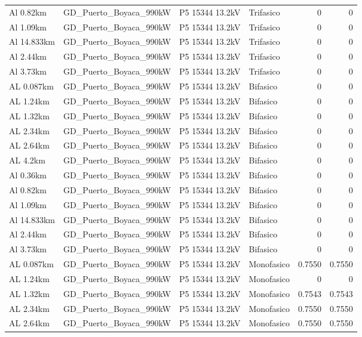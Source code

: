 \documentclass[11pt,a4paper]{article}
\begin{document}
\begin{longtable}{llllrr}
Al 0.82km & GD\_Puerto\_Boyaca\_990kW & P5 15344 13.2kV & Trifasico & 0 & 0 \\
Al 1.09km & GD\_Puerto\_Boyaca\_990kW & P5 15344 13.2kV & Trifasico & 0 & 0 \\
Al 14.833km & GD\_Puerto\_Boyaca\_990kW & P5 15344 13.2kV & Trifasico & 0 & 0 \\
Al 2.44km & GD\_Puerto\_Boyaca\_990kW & P5 15344 13.2kV & Trifasico & 0 & 0 \\
Al 3.73km & GD\_Puerto\_Boyaca\_990kW & P5 15344 13.2kV & Trifasico & 0 & 0 \\
AL 0.087km & GD\_Puerto\_Boyaca\_990kW & P5 15344 13.2kV & Bifasico & 0 & 0 \\
AL 1.24km & GD\_Puerto\_Boyaca\_990kW & P5 15344 13.2kV & Bifasico & 0 & 0 \\
AL 1.32km & GD\_Puerto\_Boyaca\_990kW & P5 15344 13.2kV & Bifasico & 0 & 0 \\
AL 2.34km & GD\_Puerto\_Boyaca\_990kW & P5 15344 13.2kV & Bifasico & 0 & 0 \\
AL 2.64km & GD\_Puerto\_Boyaca\_990kW & P5 15344 13.2kV & Bifasico & 0 & 0 \\
AL 4.2km & GD\_Puerto\_Boyaca\_990kW & P5 15344 13.2kV & Bifasico & 0 & 0 \\
Al 0.36km & GD\_Puerto\_Boyaca\_990kW & P5 15344 13.2kV & Bifasico & 0 & 0 \\
Al 0.82km & GD\_Puerto\_Boyaca\_990kW & P5 15344 13.2kV & Bifasico & 0 & 0 \\
Al 1.09km & GD\_Puerto\_Boyaca\_990kW & P5 15344 13.2kV & Bifasico & 0 & 0 \\
Al 14.833km & GD\_Puerto\_Boyaca\_990kW & P5 15344 13.2kV & Bifasico & 0 & 0 \\
Al 2.44km & GD\_Puerto\_Boyaca\_990kW & P5 15344 13.2kV & Bifasico & 0 & 0 \\
Al 3.73km & GD\_Puerto\_Boyaca\_990kW & P5 15344 13.2kV & Bifasico & 0 & 0 \\
AL 0.087km & GD\_Puerto\_Boyaca\_990kW & P5 15344 13.2kV & Monofasico & 0.7550 & 0.7550 \\
AL 1.24km & GD\_Puerto\_Boyaca\_990kW & P5 15344 13.2kV & Monofasico & 0 & 0 \\
AL 1.32km & GD\_Puerto\_Boyaca\_990kW & P5 15344 13.2kV & Monofasico & 0.7543 & 0.7543 \\
AL 2.34km & GD\_Puerto\_Boyaca\_990kW & P5 15344 13.2kV & Monofasico & 0.7550 & 0.7550 \\
AL 2.64km & GD\_Puerto\_Boyaca\_990kW & P5 15344 13.2kV & Monofasico & 0.7550 & 0.7550 \\

\end{longtable}
\end{document}
